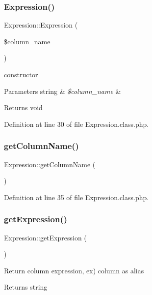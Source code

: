 \subsubsection{\texorpdfstring{Expression()}{Expression()}}
{\footnotesize\ttfamily Expression\+::\+Expression (\begin{DoxyParamCaption}\item[{}]{\$column\+\_\+name }\end{DoxyParamCaption})}

constructor 
\begin{DoxyParams}[1]{Parameters}
string & {\em \$column\+\_\+name} & \\
\hline
\end{DoxyParams}
\begin{DoxyReturn}{Returns}
void 
\end{DoxyReturn}


Definition at line 30 of file Expression.\+class.\+php.

\hypertarget{classExpression_a1822fc4ae1532c280ed017265aff00d7}{}\label{classExpression_a1822fc4ae1532c280ed017265aff00d7} 
\subsubsection{\texorpdfstring{get\+Column\+Name()}{getColumnName()}}
{\footnotesize\ttfamily Expression\+::get\+Column\+Name (\begin{DoxyParamCaption}{ }\end{DoxyParamCaption})}



Definition at line 35 of file Expression.\+class.\+php.

\hypertarget{classExpression_aac1c43a04af3c8208e48e4a67283ff81}{}\label{classExpression_aac1c43a04af3c8208e48e4a67283ff81} 
\subsubsection{\texorpdfstring{get\+Expression()}{getExpression()}}
{\footnotesize\ttfamily Expression\+::get\+Expression (\begin{DoxyParamCaption}{ }\end{DoxyParamCaption})}

Return column expression, ex) column as alias \begin{DoxyReturn}{Returns}
string 
\end{DoxyReturn}


